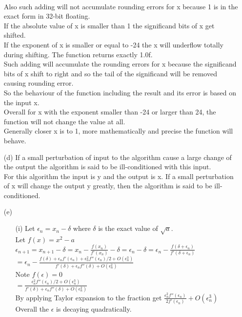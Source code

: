 \documentclass[10pt,twoside,a4paper]{article}
\begin{document}
\begin{itemize}
\\Also such adding will not accumulate rounding errors for x because 1 is in the exact form in 32-bit floating.
\\If the absolute value of x is smaller than 1 the significand bits of x get shifted.
\\If the exponent of x is smaller or equal to -24 the x will underflow totally during shifting. The function returns exactly 1.0f.
\\Such adding will accumulate the rounding errors for x because the significand bits of x shift to right and so the tail of the significand will be removed causing rounding error.
\\So the behaviour of the function including the result and its error is based on the input x.
\\Overall for x with the exponent smaller than -24 or larger than 24, the function will not change the value at all.
\\Generally closer x is to 1, more mathematically and precise the function will behave.
\item[(d)]
If a small perturbation of input to the algorithm cause a large change of the output the algorithm is said to be ill-conditioned with this input.
\\For this algorithm the input is y and the output is x. If a small perturbation of x will change the output y greatly, then the algorithm is said to be ill-conditioned.
\item[(e)]
\begin{itemize}
\item[(i)]
Let $\epsilon_n=x_n-\delta$ where $\delta$ is the exact value of $\sqrt{a}$.
\\Let $f(x)=x^2-a$
\\$\epsilon_{n+1}=x_{n+1}-\delta=x_n-\frac{f(x_n)}{f'(x_n)}-\delta=\epsilon_n-\delta=\epsilon_n-\frac{f(\delta+\epsilon_n)}{f'(\delta+\epsilon_n)}$         
\\$= \epsilon_n - \frac{f(\delta)+ \epsilon_n f'(\epsilon_n)+\epsilon_n^2f''(\epsilon_n)/2+O(\epsilon_n^3)}{f'(\delta)+\epsilon_n f''(\delta)+O(\epsilon_n^2)}$
\\Note $f(\epsilon)=0$
\\$=\frac{\epsilon_n^2f''(\epsilon_n)/2+O(\epsilon_n^3)}{f'(\delta)+\epsilon_n f''(\delta)+O(\epsilon_n^2)}$
\\By applying Taylor expansion to the fraction get $\frac{\epsilon_n^2f''(\epsilon_n)}{2f'(\epsilon_n)}+O(\epsilon_n^3)$
\\Overall the $\epsilon$ is decaying quadratically.

\end{itemize}
\end{itemize}
\end{document}
